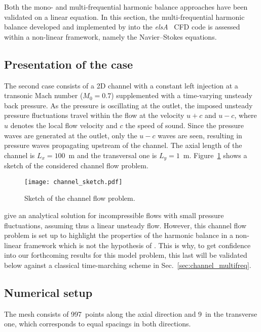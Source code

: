 
Both the mono- and multi-frequential harmonic balance
approaches have been validated on a linear equation. In this
section, the multi-frequential harmonic balance developed and
implemented by \citet{ThesisGuedeney} into the \emph{elsA}~\cite{Cambier2013}
CFD code is assessed within a non-linear framework, namely the
Navier--Stokes equations.

\subsection{Presentation of the case}
\label{sec:channel_flow_problem}

The second case consists of a 2D channel 
with a constant left injection at 
a transonic Mach number ($M_0=0.7$)
supplemented with a time-varying unsteady back pressure.
As the pressure is oscillating at the outlet, the imposed unsteady pressure
fluctuations travel within the flow at the velocity 
$u + c$ and $u - c$, where $u$ denotes 
the local flow velocity and $c$ the speed of sound.
Since the pressure waves are generated at the outlet, only
the $u-c$ waves are seen, resulting in pressure waves propagating
upstream of the channel. The axial length of the channel is $L_x = 100$~m
and the transversal one is $L_y = 1$~m.
Figure~\ref{fig:canal_principle} shows a sketch
of the considered channel flow problem.
\begin{figure}[htp]
  \centering
  \texttt{[image: channel\_sketch.pdf]}
  \caption{Sketch of the channel flow problem.}
  \label{fig:canal_principle}
\end{figure}

\citet{Merkle1987} give an analytical solution
for incompressible flows with small pressure fluctuations, assuming
thus a linear unsteady flow.
However, this channel flow problem is set up to highlight the properties
of the harmonic balance in a non-linear framework which is not
the hypothesis of \citet{Merkle1987}. This is why, to get confidence
into our forthcoming results for this model problem,
this last will be validated below against a classical time-marching scheme
in Sec.~\ref{sec:channel_multifreq}.

\subsection{Numerical setup}

The mesh consists of 997~points along the axial direction and 9~in the
transverse one, which corresponds to equal spacings in both
directions. 

